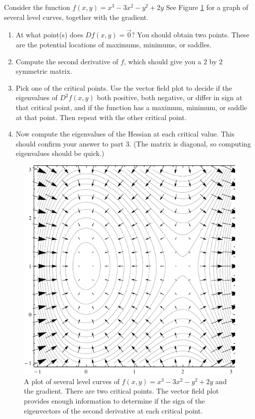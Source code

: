 \begin{problem}
 Consider the function $f(x,y) = x^3 - 3x ^2 - y^2 + 2y$
See Figure \ref{second derivative graph2} for a graph of several level curves, together with the gradient.
\begin{enumerate}
\item At what point(s) does $Df(x,y)=\vec 0$? You should obtain two points. These are the potential locations of maximums, minimums, or saddles.   
\item Compute the second derivative of $f$, which should give you a 2 by 2 symmetric matrix. 
\item Pick one of the critical points. Use the vector field plot to decide if the eigenvalues of $D^2f(x,y)$ both positive, both negative, or differ in sign at that critical point, and if the function has a maximum, minimum, or saddle at that point.  Then repeat with the other critical point. 
\item Now compute the eigenvalues of the Hessian at each critical value. This should confirm your answer to part 3. (The matrix is diagonal, so computing eigenvalues should be quick.)  
\end{enumerate}

\begin{figure}
 \begin{center}\includegraphics{second-derivative-test2}\end{center}
\caption{A plot of several level curves of $f(x,y)=x^3-3x^2-y^2+2y$ and the gradient. There are two critical points.  The vector field plot provides enough information to determine if the sign of the eigenvectors of the second derivative at each critical point. \label{second derivative graph2}}
\end{figure}
\end{problem}

